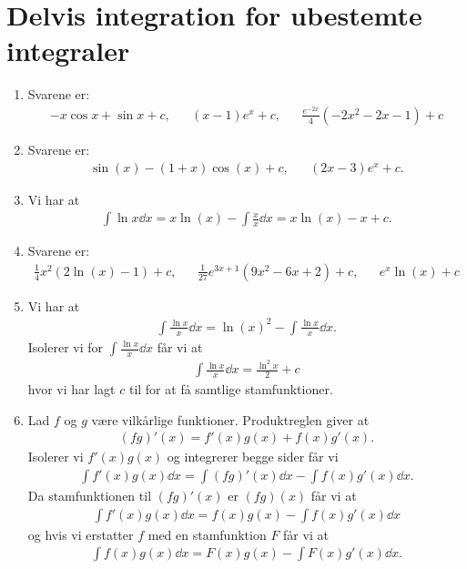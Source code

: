 \section{Delvis integration for ubestemte integraler}

\begin{enumerate}
	\item \label{it:int21ans} Svarene er:
	\begin{align*}
	 -x\cos x+\sin x+c,&& (x-1)e^x+c,&&  \frac{e^{-2x}}{4}(-2x^2-2x-1)+c
	\end{align*}
	
	\item Svarene er:
	\begin{align*}
	\sin(x)-(1+x)\cos(x)+c,&& (2x-3)e^x+c.
	\end{align*}
	
	
	
	\item Vi har at
	\begin{align*}
	\int\ln x\dd x =x\ln(x)-\int \frac{x}{x}\dd x=x\ln (x)-x+c.
	\end{align*}
	
	\item\label{it:int23ans} Svarene er:
	\begin{align*}
	\frac{1}{4}x^2(2\ln(x)-1)+c,&& \frac{1}{27}e^{3x+1}(9x^2-6x+2)+c,&& e^x\ln(x)+c
	\end{align*}
	
	\item Vi har at
	\begin{align*}
	\int \frac{\ln x}{x} \dd x= \ln(x)^2-\int \frac{\ln x}{x}\dd x.
	\end{align*}
	Isolerer vi for $\int \frac{\ln x}{x}\dd x$ får vi at
	\begin{align*}
	\int \frac{\ln x}{x}\dd x=\frac{\ln^2 x}{2}+c
	\end{align*}
	hvor vi har lagt $c$ til for at få samtlige stamfunktioner.
	
	\item Lad $f$ og $g$ være vilkårlige funktioner. Produktreglen giver at
	\begin{align*}
	(fg)'(x)=f'(x)g(x)+f(x)g'(x).
	\end{align*}
	Isolerer vi $f'(x)g(x)$ og integrerer begge sider får vi
	\begin{align*}
	\int f'(x)g(x) \dd x=\int (fg)'(x)\dd x-\int f(x)g'(x)\dd x.
	\end{align*}
	Da stamfunktionen til $(fg)'(x)$ er $(fg)(x)$ får vi at
	\begin{align*}
	\int f'(x)g(x) \dd x=f(x)g(x)-\int f(x)g'(x)\dd x
	\end{align*}	
	og hvis vi erstatter $f$ med en stamfunktion $F$ får vi at 
	\begin{align*}
	\int f(x)g(x) \dd x=F(x)g(x)-\int F(x)g'(x)\dd x.
	\end{align*}
	

\end{enumerate}
